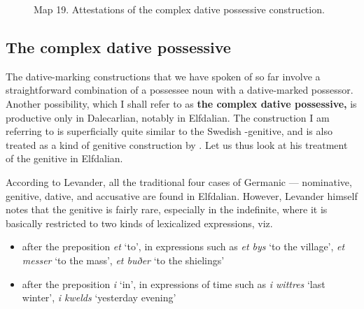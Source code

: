 

\begin{figure}[h]



Map 19. Attestations of the complex dative possessive construction.




\end{figure}

\subsection{The complex dative possessive}
\label{bkm:Ref224373337}
The dative-marking constructions that we have spoken of so far involve a straightforward combination of a possessee noun with a dative-marked possessor. Another possibility, which I shall refer to as \textbf{the complex dative possessive,} is productive only in Dalecarlian, notably in Elfdalian. The construction I am referring to is superficially quite similar to the Swedish -genitive, and is also treated as a kind of genitive construction by \citet{Levander1909}. Let us thus look at his treatment of the genitive in Elfdalian.


According to Levander, all the traditional four cases of Germanic — nominative, genitive, dative, and accusative are found in Elfdalian. However, Levander himself notes that the genitive is fairly rare, especially in the indefinite, where it is basically restricted to two kinds of lexicalized expressions, viz. 

\begin{itemize}
\item after the preposition \textit{et} ‘to’, in expressions such as \textit{et bys} ‘to the village’, \textit{et messer} ‘to the mass’, \textit{et buðer} ‘to the shielings’
\item after the preposition \textit{i} ‘in’, in expressions of time such as \textit{i wittres} ‘last winter’, \textit{i kwelds }‘yesterday evening’
\end{itemize}

